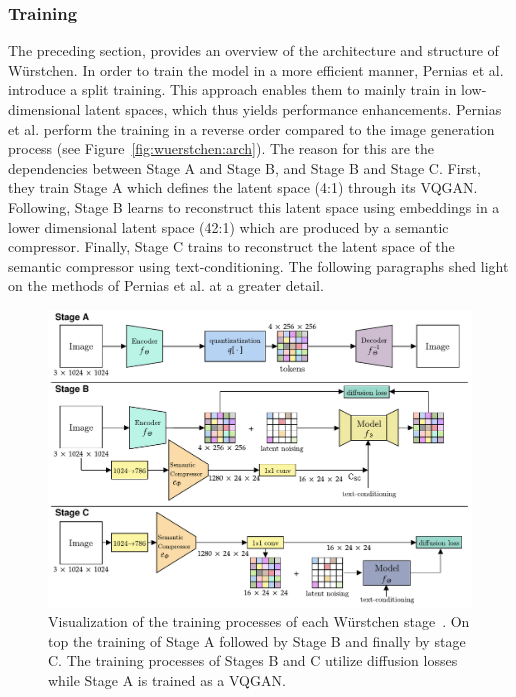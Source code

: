 \subsubsection{Training}
\label{sec:wuerstchen:training}
The preceding section, provides an overview of the architecture and structure
of W\"urstchen.
In order to train the model in a more efficient manner, Pernias et
al.~\cite{pernias2024wrstchen} introduce a split training. This approach enables
them to mainly train in low-dimensional latent spaces, which thus yields
performance enhancements. Pernias et al. perform the training in a reverse order
compared to the image generation process (see Figure~\ref{fig:wuerstchen:arch}).
The reason for this are the dependencies between Stage A and Stage B, and Stage B and Stage C.
First, they train Stage A which defines the latent space (4:1) through its VQGAN.
Following, Stage B learns to reconstruct this latent space using embeddings in a
lower dimensional latent space (42:1) which are produced by a semantic compressor.
Finally, Stage C trains to reconstruct the latent space of the semantic
compressor using text-conditioning. The following paragraphs shed light on the methods
of Pernias et al. at a greater detail.
\begin{figure}[t]
    \includegraphics[width=\textwidth]{assets/wuerstchen_training.pdf}
    \caption{Visualization of the training processes of each W\"urstchen stage~\cite{pernias2024wrstchen}.
        On top the training of Stage A followed by Stage B and finally by stage C.
        The training processes of Stages B and C utilize diffusion losses while
        Stage A is trained as a VQGAN.}
    \label{fig:wuerstchen:training}
\end{figure}

